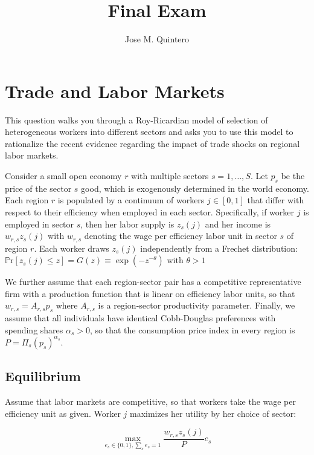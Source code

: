 \documentclass[12pt,oneside,reqno]{amsart}
\title{Final Exam}
\author{Jose M. Quintero}
\newcommand{\pr}{\mathbb{P}\mathrm{r}}
\begin{document}
\maketitle 

\section{Trade and Labor Markets}

This question walks you through a Roy-Ricardian model of selection of heterogeneous workers into different sectors and asks you to use this model to rationalize the recent evidence regarding the impact of trade shocks on regional labor markets.

Consider a small open economy $r$ with multiple sectors $s=1, \ldots, S$. Let $p_{s}$ be the price of the sector $s$ good, which is exogenously determined in the world economy. Each region $r$ is populated by a continuum of workers $j \in[0,1]$ that differ with respect to their efficiency when employed in each sector. Specifically, if worker $j$ is employed in sector $s$, then her labor supply is $z_{s}(j)$ and her income is $w_{r, s} z_{s}(j)$ with $w_{r, s}$ denoting the wage per efficiency labor unit in sector $s$ of region $r$. Each worker draws $z_{s}(j)$ independently from a Frechet distribution: $\pr\left[z_{s}(j) \leq z\right]=G(z) \equiv \exp \left(-z^{-\theta}\right)$ with $\theta>1$

We further assume that each region-sector pair has a competitive representative firm with a production function that is linear on efficiency labor units, so that $w_{r, s}=A_{r, s} p_{s}$ where $A_{r, s}$ is a region-sector productivity parameter. Finally, we assume that all individuals have identical Cobb-Douglas preferences with spending shares $\alpha_{s}>0$, so that the consumption price index in every region is $P=\Pi_{s}\left(p_{s}\right)^{\alpha_{s}}$.

\subsection{Equilibrium}

Assume that labor markets are competitive, so that workers take the wage per efficiency unit as given. Worker $j$ maximizes her utility by her choice of sector:

\begin{equation*}
\max _{e_{s} \in\{0,1\}, \sum_{s} e_{s}=1} \frac{w_{r, s} z_{s}(j)}{P} e_{s}
\end{equation*}
\end{document}
